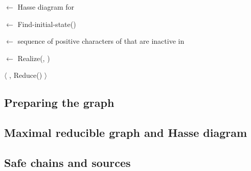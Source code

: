 \begin{algorithm}[h]
  \hasse{} $\gets$ Hasse diagram for \gm{}

  \BlankLine


  \BlankLine

  \Source $\gets$ Find-initial-state(\hasse{})

  \Sc $\gets$ sequence of positive characters of \Source that are inactive in \grb{}

  \grb{} $\gets$ Realize(\Sc, \grb{})

  \BlankLine

  \Return $\langle$ \Sc, Reduce(\grb{}) $\rangle$
\end{algorithm}


\subsection{Preparing the graph}\label{section:preparing-the-graph}

\subsection{Maximal reducible graph and Hasse diagram}\label{section:gm-hassediagram}

\subsection{Safe chains and sources}\label{section:safe-chains-sources}
